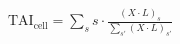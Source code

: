 \documentclass[border=3pt]{standalone}
\begin{document}
$\displaystyle \mathrm{TAI}_{\text{cell}} = \sum_s s \cdot \frac{(X \cdot L)_s}{\sum_{s'}(X \cdot L)_{s'}}$
\end{document}
